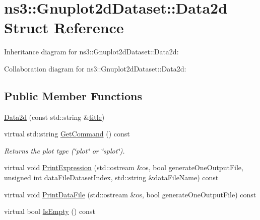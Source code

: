 \hypertarget{structns3_1_1Gnuplot2dDataset_1_1Data2d}{}\section{ns3\+:\+:Gnuplot2d\+Dataset\+:\+:Data2d Struct Reference}
\label{structns3_1_1Gnuplot2dDataset_1_1Data2d}


Inheritance diagram for ns3\+:\+:Gnuplot2d\+Dataset\+:\+:Data2d\+:


Collaboration diagram for ns3\+:\+:Gnuplot2d\+Dataset\+:\+:Data2d\+:
\subsection*{Public Member Functions}
\begin{DoxyCompactItemize}
\item 
\hyperlink{structns3_1_1Gnuplot2dDataset_1_1Data2d_ad08059dd5e5fdd88db756062d3e4d87a}{Data2d} (const std\+::string \&\hyperlink{lte__link__budget__x2__handover__measures_8m_a3f4b991df405379f6917e1683ed5a8c8}{title})
\item 
virtual std\+::string \hyperlink{structns3_1_1Gnuplot2dDataset_1_1Data2d_a81e3d75fbda382703a8f10f82feef006}{Get\+Command} () const 
\begin{DoxyCompactList}\small\item\em Returns the plot type (\char`\"{}plot\char`\"{} or \char`\"{}splot\char`\"{}). \end{DoxyCompactList}\item 
virtual void \hyperlink{structns3_1_1Gnuplot2dDataset_1_1Data2d_a731b225808d348ca9f89eacc982a8d0e}{Print\+Expression} (std\+::ostream \&os, bool generate\+One\+Output\+File, unsigned int data\+File\+Dataset\+Index, std\+::string \&data\+File\+Name) const 
\item 
virtual void \hyperlink{structns3_1_1Gnuplot2dDataset_1_1Data2d_ad9217efab969918e1dfdf25186983a09}{Print\+Data\+File} (std\+::ostream \&os, bool generate\+One\+Output\+File) const 
\item 
virtual bool \hyperlink{structns3_1_1Gnuplot2dDataset_1_1Data2d_a0bc67733fc37ba961f756d0fac81b3df}{Is\+Empty} () const 
\end{DoxyCompactItemize}
